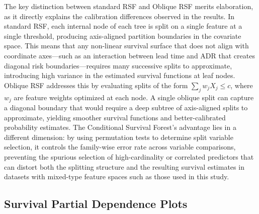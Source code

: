 \documentclass[pdflatex,iicol,sn-mathphys-ay]{sn-jnl}
\theoremstyle{thmstyleone}%
\theoremstyle{thmstyletwo}%
\theoremstyle{thmstylethree}%
\begin{document}
The key distinction between standard RSF and Oblique RSF merits elaboration, as it directly explains the calibration differences observed in the results. In standard RSF, each internal node of each tree is split on a single feature at a single threshold, producing axis-aligned partition boundaries in the covariate space. This means that any non-linear survival surface that does not align with coordinate axes—such as an interaction between lead time and ADR that creates diagonal risk boundaries—requires many successive splits to approximate, introducing high variance in the estimated survival functions at leaf nodes. Oblique RSF addresses this by evaluating splits of the form $\sum_j w_j X_j \leq c$, where $w_j$ are feature weights optimized at each node. A single oblique split can capture a diagonal boundary that would require a deep subtree of axis-aligned splits to approximate, yielding smoother survival functions and better-calibrated probability estimates. The Conditional Survival Forest's advantage lies in a different dimension: by using permutation tests to determine split variable selection, it controls the family-wise error rate across variable comparisons, preventing the spurious selection of high-cardinality or correlated predictors that can distort both the splitting structure and the resulting survival estimates in datasets with mixed-type feature spaces such as those used in this study.

\subsection{Survival Partial Dependence Plots}
\end{document}
